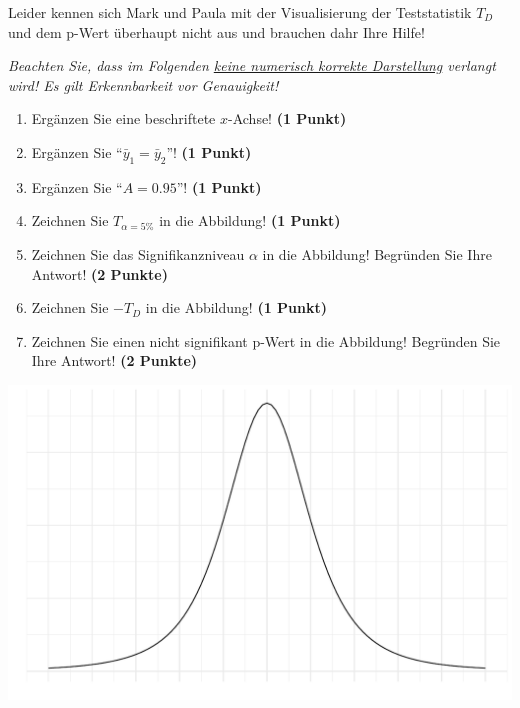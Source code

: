 \documentclass[a4paper, 9pt]{scrartcl}\usepackage[]{graphicx}\usepackage[]{xcolor}
\makeatletter
\def\maxwidth{ %
  \ifdim\Gin@nat@width>\linewidth
    \linewidth
  \else
    \Gin@nat@width
  \fi
}
\makeatother
\begin{document}
\vspace{1ex}

Leider kennen sich Mark und Paula mit der Visualisierung der Teststatistik $T_D$ und dem p-Wert überhaupt nicht aus und brauchen dahr Ihre Hilfe!

\vspace{1ex}

\textit{Beachten Sie, dass im Folgenden \underline{keine numerisch korrekte Darstellung} verlangt wird! Es gilt Erkennbarkeit vor Genauigkeit!}

\begin{enumerate}
\item Ergänzen Sie eine beschriftete $x$-Achse! \textbf{(1 Punkt)}
\item Ergänzen Sie "`$\bar{y}_1 = \bar{y}_2$"'! \textbf{(1 Punkt)} 
\item Ergänzen Sie "`$A = 0.95$"'! \textbf{(1 Punkt)}
\item Zeichnen Sie $T_{\alpha=5\%}$ in die Abbildung! \textbf{(1 Punkt)} 
\item Zeichnen Sie das Signifikanzniveau $\alpha$ in die Abbildung! Begründen Sie Ihre Antwort! \textbf{(2 Punkte)} 
\item Zeichnen Sie $-T_{D}$ in die Abbildung! \textbf{(1 Punkt)}
\item Zeichnen Sie einen nicht signifikant p-Wert in die Abbildung! Begründen Sie Ihre Antwort! \textbf{(2 Punkte)}   
\end{enumerate}



{\centering \includegraphics[width=\maxwidth]{img/statistisches-testen-3-1} 

}


 
\clearpage
\end{document}

